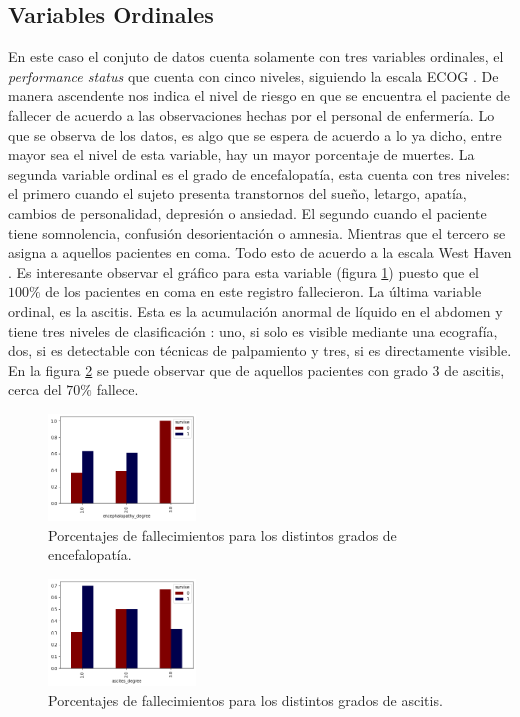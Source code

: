 \documentclass[6pt, twocolumn]{article}
\begin{document}
\subsection{Variables Ordinales}
En este caso el conjuto de datos cuenta solamente con tres variables ordinales, el \textit{performance status} que cuenta con cinco niveles, siguiendo la escala ECOG \cite{ECOG}. De manera ascendente nos indica el nivel de riesgo en que se encuentra el paciente de fallecer de acuerdo a las observaciones hechas por el personal de enfermería. Lo que se observa de los datos, es algo que se espera de acuerdo a lo ya dicho, entre mayor sea el  nivel de esta variable, hay un mayor porcentaje de muertes. La segunda variable ordinal es el grado de encefalopatía, esta cuenta con tres niveles: el primero cuando el sujeto presenta transtornos del sueño, letargo, apatía, cambios de personalidad, depresión o ansiedad. El segundo cuando el paciente tiene somnolencia, confusión desorientación o amnesia. Mientras que el tercero se asigna a aquellos pacientes en coma. Todo esto de acuerdo a la escala West Haven \cite{enc}. Es interesante observar el gráfico para esta variable (figura \ref{fig:ence}) puesto que el $100\%$ de los pacientes  en coma en este registro fallecieron. La última variable ordinal, es la ascitis. Esta es la acumulación anormal de líquido en el abdomen y tiene tres niveles de clasificación \cite{ascites}: uno, si solo es visible mediante una ecografía, dos, si es detectable con técnicas de palpamiento y tres, si es directamente visible. En la figura \ref{fig:ascites} se puede observar que de aquellos pacientes con grado 3 de ascitis, cerca del $70\%$ fallece.


\begin{figure}
\centering
\includegraphics[width = 0.35\textwidth]{./ence.png}
\caption{\footnotesize \label{fig:ence}Porcentajes de fallecimientos para los distintos grados de encefalopatía.}
\end{figure}

\begin{figure}
\centering
\includegraphics[width = 0.35\textwidth]{./ascites.png}
\caption{\footnotesize \label{fig:ascites}Porcentajes de fallecimientos para los distintos grados de ascitis.}
\end{figure}
\end{document}

